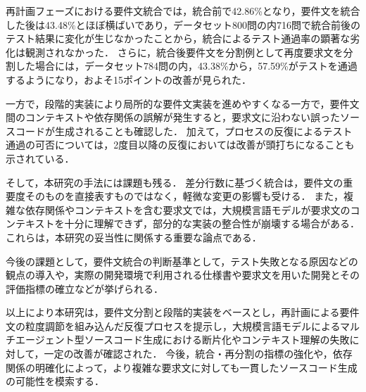 \documentclass[11pt]{jreport}
\begin{document}
再計画フェーズにおける要件文統合では，統合前で42.86\%となり，要件文を統合した後は43.48\%とほぼ横ばいであり，データセット800問の内716問で統合前後のテスト結果に変化が生じなかったことから，統合によるテスト通過率の顕著な劣化は観測されなかった．
さらに，統合後要件文を分割例として再度要求文を分割した場合には，データセット784問の内，43.38\%から，57.59\%がテストを通過するようになり，およそ15ポイントの改善が見られた．

一方で，段階的実装により局所的な要件文実装を進めやすくなる一方で，要件文間のコンテキストや依存関係の誤解が発生すると，要求文に沿わない誤ったソースコードが生成されることも確認した．
加えて，プロセスの反復によるテスト通過の可否については，2度目以降の反復においては改善が頭打ちになることも示されている．

そして，本研究の手法には課題も残る．
差分行数に基づく統合は，要件文の重要度そのものを直接表すものではなく，軽微な変更の影響も受ける．
また，複雑な依存関係やコンテキストを含む要求文では，大規模言語モデルが要求文のコンテキストを十分に理解できず，部分的な実装の整合性が崩壊する場合がある．
これらは，本研究の妥当性に関係する重要な論点である．

今後の課題として，要件文統合の判断基準として，テスト失敗となる原因などの観点の導入や，実際の開発環境で利用される仕様書や要求文を用いた開発とその評価指標の確立などが挙げられる．

以上により本研究は，要件文分割と段階的実装をベースとし，再計画による要件文の粒度調節を組み込んだ反復プロセスを提示し，大規模言語モデルによるマルチエージェント型ソースコード生成における断片化やコンテキスト理解の失敗に対して，一定の改善が確認された．
今後，統合・再分割の指標の強化や，依存関係の明確化によって，より複雑な要求文に対しても一貫したソースコード生成の可能性を模索する．


\end{document}
